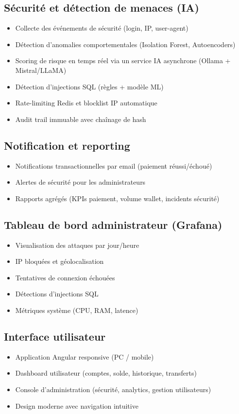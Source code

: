 \documentclass[12pt,a4paper]{report}
\begin{document}
\subsection*{Sécurité et détection de menaces (IA)}
\begin{itemize}[leftmargin=*,label=--]
\item Collecte des événements de sécurité (login, IP, user-agent)
\item Détection d'anomalies comportementales (Isolation Forest, Autoencoders)
\item Scoring de risque en temps réel via un service IA asynchrone (Ollama + Mistral/LLaMA)
\item Détection d'injections SQL (règles + modèle ML)
\item Rate-limiting Redis et blocklist IP automatique
\item Audit trail immuable avec chaînage de hash
\end{itemize}

\subsection*{Notification et reporting}
\begin{itemize}[leftmargin=*,label=--]
\item Notifications transactionnelles par email (paiement réussi/échoué)
\item Alertes de sécurité pour les administrateurs
\item Rapports agrégés (KPIs paiement, volume wallet, incidents sécurité)
\end{itemize}

\subsection*{Tableau de bord administrateur (Grafana)}
\begin{itemize}[leftmargin=*,label=--]
\item Visualisation des attaques par jour/heure
\item IP bloquées et géolocalisation
\item Tentatives de connexion échouées
\item Détections d'injections SQL
\item Métriques système (CPU, RAM, latence)
\end{itemize}

\subsection*{Interface utilisateur}
\begin{itemize}[leftmargin=*,label=--]
\item Application Angular responsive (PC / mobile)
\item Dashboard utilisateur (comptes, solde, historique, transferts)
\item Console d'administration (sécurité, analytics, gestion utilisateurs)
\item Design moderne avec navigation intuitive
\end{itemize}
\end{document}
